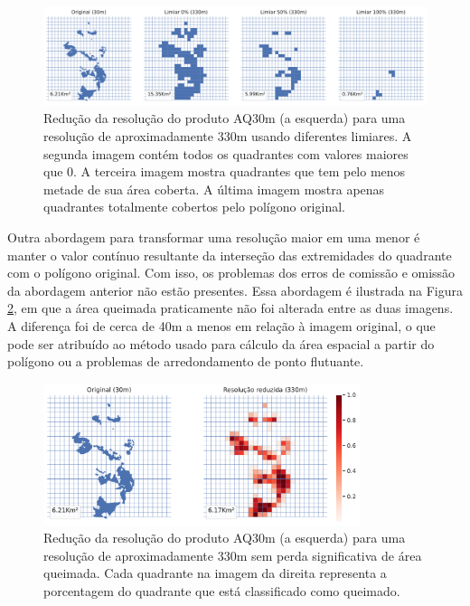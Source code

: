 \documentclass[cic,tc]{iiufrgs}
\begin{document}
\begin{figure}[!htb]
    \caption{Redução da resolução do produto AQ30m (a esquerda) para uma resolução de aproximadamente 330m usando diferentes limiares. A segunda imagem contém todos os quadrantes com valores maiores que 0. A terceira imagem mostra quadrantes que tem pelo menos metade de sua área coberta. A última imagem mostra apenas quadrantes totalmente cobertos pelo polígono original.}
    \begin{center}
        \includegraphics[width=35em]{diferenca_resoluções}
    \end{center}
    \label{fig:diferenca_resoluções}
\end{figure}

Outra abordagem para transformar uma resolução maior em uma menor é manter o valor contínuo resultante da interseção das extremidades do quadrante com o polígono original. Com isso, os problemas dos erros de comissão e omissão da abordagem anterior não estão presentes. Essa abordagem é ilustrada na Figura \ref{fig:resolução_continua}, em que a área queimada praticamente não foi alterada entre as duas imagens. A diferença foi de cerca de 40m a menos em relação à imagem original, o que pode ser atribuído ao método usado para cálculo da área espacial a partir do polígono ou a problemas de arredondamento de ponto flutuante.

\begin{figure}[!htb]
    \caption{Redução da resolução do produto AQ30m (a esquerda) para uma resolução de aproximadamente 330m sem perda significativa de área queimada. Cada quadrante na imagem da direita representa a porcentagem do quadrante que está classificado como queimado.}
    \begin{center}
        \includegraphics[width=25em]{resolução_continua}
    \end{center}
    \label{fig:resolução_continua}
\end{figure}
\end{document}
